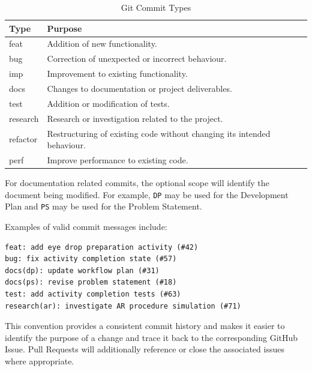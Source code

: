 \documentclass{article}
\begin{document}
\begin{table}[H]
    \centering
    \begin{tabular}{|l|p{8.5cm}|}
        \hline
        \textbf{Type} & \textbf{Purpose} \\ \hline

        feat &
        Addition of new functionality. \\ \hline

        bug &
        Correction of unexpected or incorrect behaviour. \\ \hline

        imp &
        Improvement to existing functionality. \\ \hline

        docs &
        Changes to documentation or project deliverables. \\ \hline

        test &
        Addition or modification of tests. \\ \hline

        research &
        Research or investigation related to the project. \\ \hline

        refactor &
        Restructuring of existing code without changing its intended behaviour. \\ \hline

        perf &
        Improve performance to existing code. \\ \hline
    \end{tabular}

    \caption{Git Commit Types}
    \label{tab:commit-types}
\end{table}

For documentation related commits, the optional scope will identify the
document being modified. For example, \texttt{DP} may be used for the
Development Plan and \texttt{PS} may be used for the Problem Statement.

Examples of valid commit messages include:

\begin{lstlisting}[caption={Example Commit Messages}]
feat: add eye drop preparation activity (#42)
bug: fix activity completion state (#57)
docs(dp): update workflow plan (#31)
docs(ps): revise problem statement (#18)
test: add activity completion tests (#63)
research(ar): investigate AR procedure simulation (#71)
\end{lstlisting}

This convention provides a consistent commit history and makes it easier to
identify the purpose of a change and trace it back to the corresponding
GitHub Issue. Pull Requests will additionally reference or close the
associated issues where appropriate.
\end{document}
